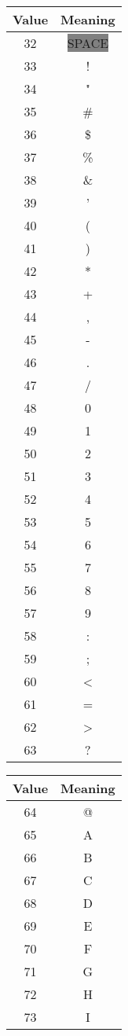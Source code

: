 \documentclass[12pt]{book}
\begin{document}
{\begin{tabular}{c c}
    \hline
    Value & Meaning \\
    \hline
     32 & \colorbox{gray}{SPACE} \\
     33 & ! \\
     34 & " \\
     35 & \# \\
     36 & \$ \\
     37 & \% \\
     38 & \& \\
     39 & ' \\
     40 & ( \\
     41 & ) \\
     42 & * \\
     43 & + \\
     44 & , \\
     45 & - \\
     46 & . \\
     47 & / \\
     48 & 0 \\
     49 & 1 \\
     50 & 2 \\
     51 & 3 \\
     52 & 4 \\
     53 & 5 \\
     54 & 6 \\
     55 & 7 \\
     56 & 8 \\
     57 & 9 \\
     58 & : \\
     59 & ; \\
     60 & < \\
     61 & = \\
     62 & > \\
     63 & ? \\
  \end{tabular}
  \quad
  \begin{tabular}{c c}
    \hline
    Value & Meaning \\
    \hline
     64 & @ \\
     65 & A \\
     66 & B \\
     67 & C \\
     68 & D \\
     69 & E \\
     70 & F \\
     71 & G \\
     72 & H \\
     73 & I \\

\end{tabular}}
\end{document}
